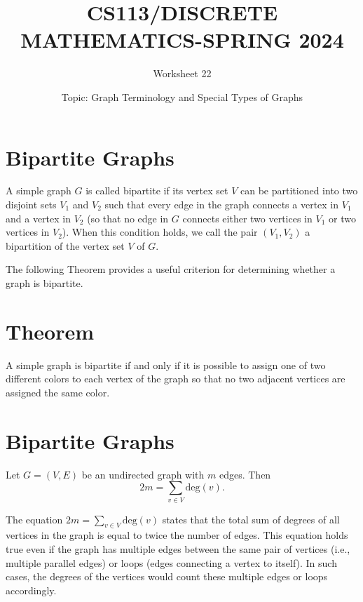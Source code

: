 \documentclass{exam}
\title{CS113/DISCRETE MATHEMATICS-SPRING 2024}
\author{Worksheet 22}
\date{Topic: Graph Terminology and Special Types of Graphs}
\begin{document}
\maketitle
\vspace{5mm}
\begin{center}
\end{center}
\vspace{5mm}


\vspace{5mm}

\vspace{5mm}

\section{Bipartite Graphs}
A simple graph $G$ is called bipartite if its vertex set $V$ can be partitioned into two disjoint sets $V_1$ and $V_2$ such that every edge in the graph connects a vertex in $V_1$ and a vertex in $V_2$ (so that no edge in $G$ connects either two vertices in $V_1$ or two vertices in $V_2$). When this condition holds, we call the pair $(V_1, V_2)$ a bipartition of the vertex set $V$ of $G$.

The following Theorem provides a useful criterion for determining whether a graph is bipartite.

\section{Theorem}
A simple graph is bipartite if and only if it is possible to assign one of two different colors to
each vertex of the graph so that no two adjacent vertices are assigned the same color.

\section{Bipartite Graphs}
Let \(G = (V, E)\) be an undirected graph with \(m\) edges. Then
\[2m = \sum_{v\in V} \text{deg}(v).\]

The equation \(2m = \sum_{v\in V} \text{deg}(v)\) states that the total sum of degrees of all vertices in the graph is equal to twice the number of edges. This equation holds true even if the graph has multiple edges between the same pair of vertices (i.e., multiple parallel edges) or loops (edges connecting a vertex to itself). In such cases, the degrees of the vertices would count these multiple edges or loops accordingly.\\
\end{document}

